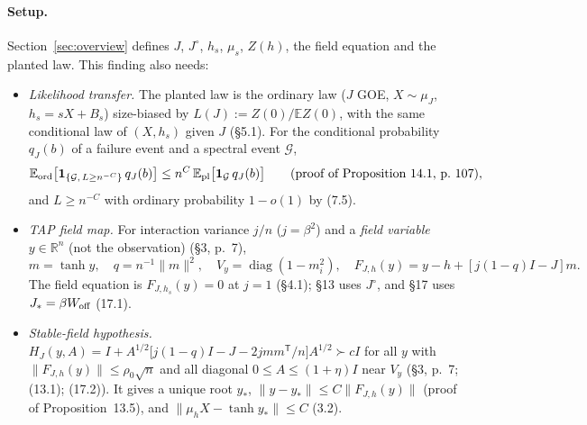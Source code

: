 \documentclass[11pt]{article}
\newcommand{\R}{\mathbb{R}}
\newcommand{\E}{\mathbb{E}}
\newcommand{\one}{\mathbf{1}}
\newcommand{\norm}[1]{\lVert #1\rVert}
\newcommand{\ploc}[2]{#1}
\begin{document}
\paragraph{Setup.}
Section~\ref{sec:overview} defines $J$, $J^\circ$, $h_s$, $\mu_s$, $Z(h)$, the
field equation and the planted law. This finding also needs:
\begin{itemize}
\item \emph{Likelihood transfer.} The planted law is the ordinary law ($J$ GOE,
$X\sim\mu_J$, $h_s=sX+B_s$) size-biased by $L(J):=Z(0)/\E Z(0)$, with the
same conditional law of $(X,h_s)$ given $J$
\ploc{(\S5.1)}{profile-spectral.tex:31--48}. For the conditional probability
$q_J(b)$ of a failure event and a spectral event $\mathcal G$,
\[
 \E_{\rm ord}\bigl[\one_{\{\mathcal G,\,L\ge n^{-C}\}}\,q_J(b)\bigr]
 \le n^C\,\E_{\rm pl}\bigl[\one_{\mathcal G}\,q_J(b)\bigr]
 \qquad\text{\ploc{(proof of Proposition~14.1, p.~107)}{profile-entropy.tex:240--248}},
\]
and $L\ge n^{-C}$ with ordinary probability $1-o(1)$ by
\ploc{(7.5)}{profile-spectral.tex:1343--1347}.
\item \emph{TAP field map.} For interaction variance $j/n$ ($j=\beta^2$) and a
\emph{field variable} $y\in\R^n$ (not the observation)
\ploc{(\S3, p.~7)}{accepted-inputs.tex:17--23},
\[
 m=\tanh y,\quad q=n^{-1}\norm m^2,\quad V_y=\operatorname{diag}(1-m_i^2),\quad
 F_{J,h}(y)=y-h+[j(1-q)I-J]m .
\]
The field equation is $F_{J,h_s}(y)=0$ at $j=1$
\ploc{(\S4.1)}{proof-overview.tex:47--50}; \S13 uses $J^\circ$, and \S17 uses
$J_*=\beta W_{\rm off}$ \ploc{(17.1)}{cap-classical.tex:13--21}.
\item \emph{Stable-field hypothesis.}
$H_J(y,A)=I+A^{1/2}\bigl[j(1-q)I-J-2jmm^{\mathsf T}/n\bigr]A^{1/2}\succ cI$ for
all $y$ with $\norm{F_{J,h}(y)}\le\rho_0\sqrt n$ and all diagonal
$0\le A\le(1+\eta)I$ near $V_y$
\ploc{(\S3, p.~7; (13.1); (17.2))}{accepted-inputs.tex:21--30; profile-positive.tex:16--30; cap-classical.tex:24--38}.
It gives a unique root $y_*$, $\norm{y-y_*}\le C\norm{F_{J,h}(y)}$
\ploc{(proof of Proposition~13.5)}{profile-positive.tex:1024--1033}, and
$\norm{\mu_hX-\tanh y_*}\le C$ \ploc{(3.2)}{accepted-inputs.tex:44--55}.
\end{itemize}
\end{document}
